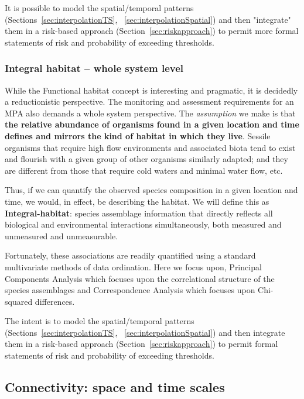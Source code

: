 \documentclass[letterpaper,portrait,11pt]{scrartcl}
\numberwithin{equation}{section}		%
\numberwithin{figure}{section}		%
\numberwithin{table}{section}				%
\begin{document}
It is possible to model the spatial/temporal patterns (Sections~\ref{sec:interpolationTS}, ~\ref{sec:interpolationSpatial}) and then "integrate" them in a risk-based approach (Section~\ref{sec:riskapproach}) to permit more formal statements of risk and probability of exceeding thresholds. 


\subsubsection{Integral habitat -- whole system level}
\label{sec:integralHabitat}

While the Functional habitat concept is interesting and pragmatic, it is decidedly a reductionistic perspective. The monitoring and assessment requirements for an MPA also demands a whole system perspective. The \textit{assumption} we make is that \textbf{the relative abundance of organisms found in a given location and time defines and mirrors the kind of habitat in which they live}. Sessile organisms that require high flow environments and associated biota tend to exist and flourish with a given group of other organisms similarly adapted; and they are different from those that require cold waters and minimal water flow, etc. 

Thus, if we can quantify the observed species composition in a given location and time, we would, in effect, be describing the habitat. We will define this as \textbf{Integral-habitat}: species assemblage information that directly reflects all biological and environmental interactions simultaneously, both measured and unmeasured and unmeasurable. 

Fortunately, these associations are readily quantified using a standard multivariate methods of data ordination. Here we focus upon, Principal Components Analysis which focuses upon the correlational structure of the species assemblages and Correspondence Analysis which focuses upon Chi-squared differences.  

The intent is to model the spatial/temporal patterns (Sections~\ref{sec:interpolationTS}, ~\ref{sec:interpolationSpatial}) and then integrate them in a risk-based approach (Section~\ref{sec:riskapproach}) to permit formal statements of risk and probability of exceeding thresholds. 


\subsection{Connectivity: space and time scales}
\end{document}
